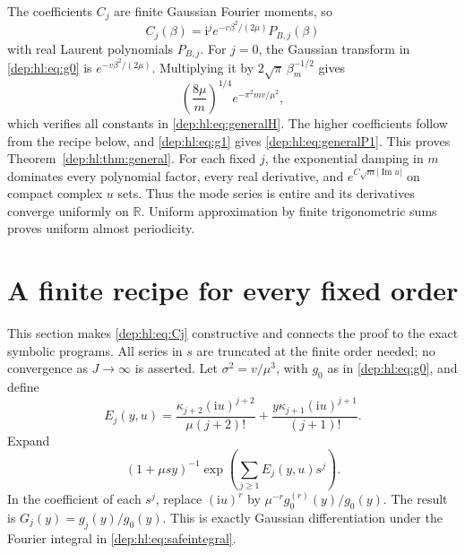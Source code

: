 \documentclass[11pt]{article}
\theoremstyle{definition}\newtheorem{definition}[theorem]{Definition}
\theoremstyle{remark}\newtheorem{remark}[theorem]{Remark}
\newcommand{\ii}{\mathrm i}
\newcommand{\RR}{\mathbb R}
\DeclareMathOperator{\Impart}{Im}
\begin{document}
The coefficients $C_j$ are finite Gaussian Fourier moments, so
\begin{equation}\label{dep:hl:eq:Cj}
 C_j(\beta)=\ii^j e^{-v\beta^2/(2\mu)}P_{B,j}(\beta)
\end{equation}
with real Laurent polynomials $P_{B,j}$. For $j=0$, the Gaussian
transform in \eqref{dep:hl:eq:g0} is $e^{-v\beta^2/(2\mu)}$.
Multiplying it by $2\sqrt\pi\,\beta_m^{-1/2}$ gives
\[
 \left(\frac{8\mu}{m}\right)^{1/4}e^{-\pi^2mv/\mu^2},
\]
which verifies all constants in \eqref{dep:hl:eq:generalH}. The higher
coefficients follow from the recipe below, and \eqref{dep:hl:eq:g1} gives
\eqref{dep:hl:eq:generalP1}. This proves Theorem~\ref{dep:hl:thm:general}.
For each fixed $j$, the exponential damping in $m$ dominates every
polynomial factor, every real derivative, and
$e^{C\sqrt m|\Impart u|}$ on compact complex $u$ sets. Thus the mode
series is entire and its derivatives converge uniformly on $\RR$.
Uniform approximation by finite trigonometric sums proves uniform
almost periodicity.

\section{A finite recipe for every fixed order}\label{dep:hl:sec:recipe}
This section makes \eqref{dep:hl:eq:Cj} constructive and connects the proof
to the exact symbolic programs. All series in $s$ are truncated at the
finite order needed; no convergence as $J\to\infty$ is asserted.
Let $\sigma^2=v/\mu^3$, with $g_0$ as in \eqref{dep:hl:eq:g0}, and define
\begin{equation}\label{dep:hl:eq:Ej}
 E_j(y,u)=\frac{\kappa_{j+2}(\ii u)^{j+2}}{\mu(j+2)!}
             +\frac{y\kappa_{j+1}(\ii u)^{j+1}}{(j+1)!}.
\end{equation}
Expand
\[
 (1+\mu sy)^{-1}\exp\left(\sum_{j\ge1}E_j(y,u)s^j\right).
\]
In the coefficient of each $s^j$, replace $(\ii u)^r$ by
$\mu^{-r}g_0^{(r)}(y)/g_0(y)$. The result is
$G_j(y)=g_j(y)/g_0(y)$. This is exactly Gaussian differentiation
under the Fourier integral in \eqref{dep:hl:eq:safeintegral}.
\end{document}
